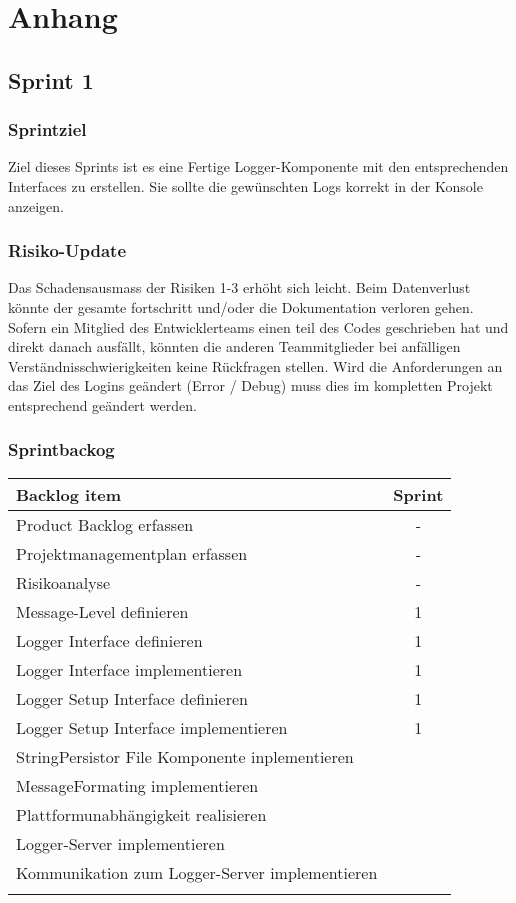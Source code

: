 \section{Anhang}
\subsection{Sprint 1}
\subsubsection{Sprintziel}
Ziel dieses Sprints ist es eine Fertige Logger-Komponente mit den entsprechenden Interfaces zu erstellen. Sie sollte die gewünschten Logs korrekt in der Konsole anzeigen. 
\subsubsection{Risiko-Update}
Das Schadensausmass der Risiken 1-3 erhöht sich leicht. 
Beim Datenverlust könnte der gesamte fortschritt und/oder die Dokumentation verloren gehen. 
Sofern ein Mitglied des Entwicklerteams einen teil des Codes geschrieben hat und direkt danach ausfällt, könnten die anderen Teammitglieder bei anfälligen Verständnisschwierigkeiten keine Rückfragen stellen.
Wird die Anforderungen an das Ziel des Logins geändert (Error / Debug) muss dies im kompletten Projekt entsprechend geändert werden. 
\subsubsection{Sprintbackog}
	\begin{tabularx}{\textwidth}{|p{}|c|}
		\hline
		\textbf{Backlog item} & \textbf{Sprint} \\
		\hline
		Product Backlog erfassen & -
\\
		\hline
		Projektmanagementplan erfassen & -
\\
		\hline
		Risikoanalyse & -
\\
		\hline
		Message-Level definieren & 1
\\
		\hline
		Logger Interface definieren & 1 \\
		\hline
		Logger Interface implementieren & 1
\\
		\hline
		Logger Setup Interface definieren & 1
\\
		\hline
		Logger Setup Interface implementieren & 1
\\
		\hline
		StringPersistor File Komponente inplementieren & \\
		\hline
		MessageFormating implementieren & \\
		\hline
		Plattformunabhängigkeit realisieren & \\
		\hline
		Logger-Server implementieren & \\
		\hline
		Kommunikation zum Logger-Server implementieren & \\
		\hline
		\caption{Sprintbacklog 1}
	\end{tabularx}

